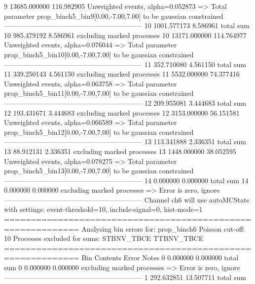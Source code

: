 9          13685.000000    116.982905      Unweighted events, alpha=0.052873
  => Total parameter prop_binch5_bin9[0.00,-7.00,7.00] to be gaussian constrained
------------------------------------------------------------
10         1001.577173     8.586961        total sum                     
10         985.479192      8.586961        excluding marked processes    
10         13171.000000    114.764977      Unweighted events, alpha=0.076044
  => Total parameter prop_binch5_bin10[0.00,-7.00,7.00] to be gaussian constrained
------------------------------------------------------------
11         352.710080      4.561150        total sum                     
11         339.250143      4.561150        excluding marked processes    
11         5532.000000     74.377416       Unweighted events, alpha=0.063758
  => Total parameter prop_binch5_bin11[0.00,-7.00,7.00] to be gaussian constrained
------------------------------------------------------------
12         209.955081      3.444683        total sum                     
12         193.431671      3.444683        excluding marked processes    
12         3153.000000     56.151581       Unweighted events, alpha=0.066589
  => Total parameter prop_binch5_bin12[0.00,-7.00,7.00] to be gaussian constrained
------------------------------------------------------------
13         113.341888      2.336351        total sum                     
13         88.912131       2.336351        excluding marked processes    
13         1448.000000     38.052595       Unweighted events, alpha=0.078275
  => Total parameter prop_binch5_bin13[0.00,-7.00,7.00] to be gaussian constrained
------------------------------------------------------------
14         0.000000        0.000000        total sum                     
14         0.000000        0.000000        excluding marked processes    
  => Error is zero, ignore      
------------------------------------------------------------
Channel ch6 will use autoMCStats with settings: event-threshold=10, include-signal=0, hist-mode=1
============================================================
Analysing bin errors for: prop_binch6
Poisson cut-off: 10
Processes excluded for sums: STBNV_TBCE TTBNV_TBCE
============================================================
Bin        Contents        Error           Notes                         
0          0.000000        0.000000        total sum                     
0          0.000000        0.000000        excluding marked processes    
  => Error is zero, ignore      
------------------------------------------------------------
1          292.632851      13.507711       total sum                     

